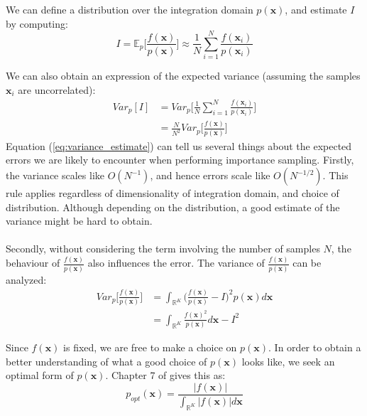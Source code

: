 We can define a distribution over the integration domain \(p(\mathbf{x})\), and estimate \(I\) by computing:
\begin{equation}\label{eq:MCInt}
    I = \mathbb{E}_p\bigg[ \frac{f(\mathbf{x})}{p(\mathbf{x})} \bigg] \approx \frac{1}{N} \sum_{i=1} ^ N \frac{f(\mathbf{x}_i)}{p(\mathbf{x}_i)} 
\end{equation}

We can also obtain an expression of the expected variance (assuming the samples \(\mathbf{x}_i\) are uncorrelated):
\begin{equation} \label{eq:variance_estimate}
    \begin{split}
        Var_p[I] & = Var_p\bigg[ \frac{1}{N} \sum_{i=1} ^ N \frac{f(\mathbf{x}_i)}{p(\mathbf{x}_i)} \bigg] \\
        & = \frac{N}{N^2} Var_p\bigg[ \frac{f(\mathbf{x})}{p(\mathbf{x})} \bigg]
    \end{split}
\end{equation}
Equation (\ref{eq:variance_estimate}) can tell us several things about the expected errors we are likely to encounter when performing importance sampling. Firstly, the variance scales like \(O(N^{-1})\), and hence errors scale like \(O(N^{-1/2})\). This rule applies regardless of dimensionality of integration domain, and choice of distribution. Although depending on the distribution, a good estimate of the variance might be hard to obtain. 
\\\\
Secondly, without considering the term involving the number of samples \(N\), the behaviour of \(\frac{f(\mathbf{x})}{p(\mathbf{x})}\) also influences the error. The variance of \(\frac{f(\mathbf{x})}{p(\mathbf{x})}\) can be analyzed:
\begin{equation}
    \begin{split}
        Var_p\bigg[ \frac{f(\mathbf{x})}{p(\mathbf{x})} \bigg] & = \int_{\mathbb{R}^K} \bigg( \frac{f(\mathbf{x})}{p(\mathbf{x})}  - I \bigg)^2 p(\mathbf{x}) d \mathbf{x} \\
        & = \int_{\mathbb{R}^K} \frac{f(\mathbf{x})^2}{p(\mathbf{x})} d \mathbf{x} - I^2
    \end{split}
\end{equation}

Since \(f(\mathbf{x})\) is fixed, we are free to make a choice on \(p(\mathbf{x})\). In order to obtain a better understanding of what a good choice of \(p(\mathbf{x})\) looks like, we seek an optimal form of \(p(\mathbf{x})\). Chapter 7 of \cite{Press2007NumericalComputing} gives this as:
\[p_{opt}(\mathbf{x}) = \frac{|f(\mathbf{x})|}{\int_{\mathbb{R}^K} |f(\mathbf{x})| d \mathbf{x}} \]

